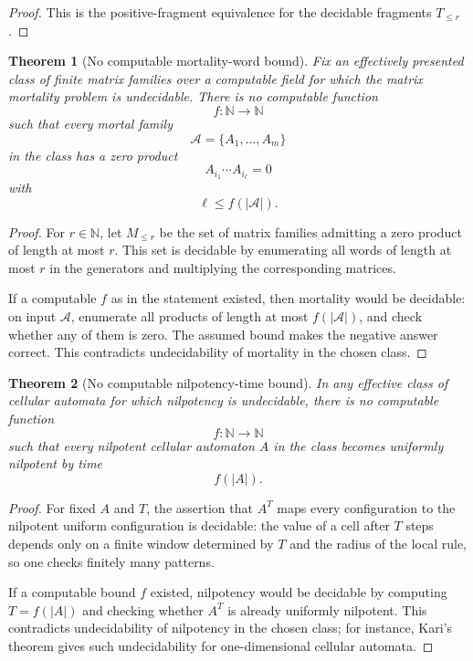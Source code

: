 \documentclass[11pt]{article}
\newtheorem{theorem}{Theorem}[section]
\begin{document}
\begin{proof}
This is the positive-fragment equivalence for the decidable fragments \(T_{\leq r}\).
\end{proof}

\begin{theorem}[No computable mortality-word bound]
Fix an effectively presented class of finite matrix families over a computable field for which the matrix mortality problem is undecidable. There is no computable function
\[
f:\mathbb N\to\mathbb N
\]
such that every mortal family
\[
\mathcal A=\{A_1,\ldots,A_m\}
\]
in the class has a zero product
\[
A_{i_1}\cdots A_{i_\ell}=0
\]
with
\[
\ell\leq f(|\mathcal A|).
\]
\end{theorem}

\begin{proof}
For \(r\in\mathbb N\), let \(M_{\leq r}\) be the set of matrix families admitting a zero product of length at most \(r\). This set is decidable by enumerating all words of length at most \(r\) in the generators and multiplying the corresponding matrices.

If a computable \(f\) as in the statement existed, then mortality would be decidable: on input \(\mathcal A\), enumerate all products of length at most \(f(|\mathcal A|)\), and check whether any of them is zero. The assumed bound makes the negative answer correct. This contradicts undecidability of mortality in the chosen class.
\end{proof}

\begin{theorem}[No computable nilpotency-time bound]
In any effective class of cellular automata for which nilpotency is undecidable, there is no computable function
\[
f:\mathbb N\to\mathbb N
\]
such that every nilpotent cellular automaton \(A\) in the class becomes uniformly nilpotent by time
\[
f(|A|).
\]
\end{theorem}

\begin{proof}
For fixed \(A\) and \(T\), the assertion that \(A^T\) maps every configuration to the nilpotent uniform configuration is decidable: the value of a cell after \(T\) steps depends only on a finite window determined by \(T\) and the radius of the local rule, so one checks finitely many patterns.

If a computable bound \(f\) existed, nilpotency would be decidable by computing \(T=f(|A|)\) and checking whether \(A^T\) is already uniformly nilpotent. This contradicts undecidability of nilpotency in the chosen class; for instance, Kari's theorem gives such undecidability for one-dimensional cellular automata.
\end{proof}
\end{document}
